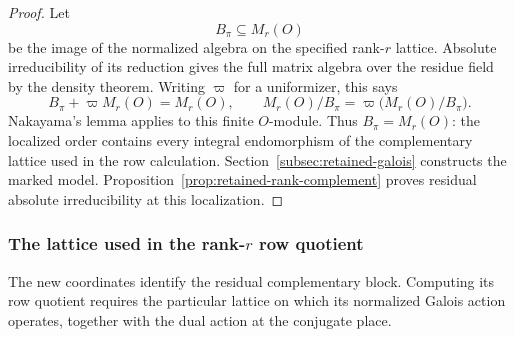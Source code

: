 \begin{proof}
Let
\[
 B_\pi\subseteq M_r(O)
\]
be the image of the normalized algebra
on the specified rank-\(r\) lattice. Absolute irreducibility of its
reduction gives the full matrix algebra over the residue field by
the density theorem. Writing \(\varpi\) for a uniformizer, this says
\[
 B_\pi+\varpi M_r(O)=M_r(O),\qquad
 M_r(O)/B_\pi=\varpi\bigl(M_r(O)/B_\pi\bigr).
\]
Nakayama's lemma applies to this finite \(O\)-module. Thus \(B_\pi=M_r(O)\): the localized order contains every integral endomorphism of the complementary lattice used in the row calculation.
Section~\ref{subsec:retained-galois} constructs the marked model.
Proposition~\ref{prop:retained-rank-complement} proves residual
absolute irreducibility at this localization.

\end{proof}
\subsubsection*{The lattice used in the rank-\(r\) row quotient}

The new coordinates identify the residual complementary block. Computing its row quotient requires the particular lattice on which its normalized Galois action operates, together with the dual action at the conjugate place.

